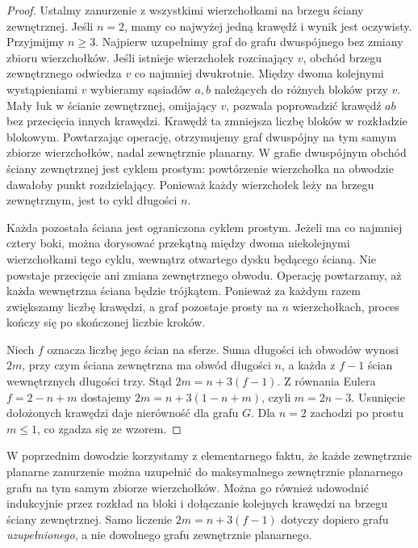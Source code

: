 \begin{proof}
Ustalmy zanurzenie z wszystkimi wierzchołkami na brzegu
ściany zewnętrznej. Jeśli $n=2$, mamy co najwyżej jedną
krawędź i wynik jest oczywisty. Przyjmijmy $n\ge3$.
Najpierw uzupełnimy graf do grafu dwuspójnego bez zmiany
zbioru wierzchołków. Jeśli istnieje wierzchołek rozcinający
$v$, obchód brzegu zewnętrznego odwiedza $v$ co najmniej
dwukrotnie. Między dwoma kolejnymi wystąpieniami $v$
wybieramy sąsiadów $a,b$ należących do różnych bloków
przy $v$. Mały łuk w ścianie zewnętrznej, omijający $v$,
pozwala poprowadzić krawędź $ab$ bez przecięcia innych
krawędzi. Krawędź ta zmniejsza liczbę bloków w rozkładzie
blokowym. Powtarzając operację, otrzymujemy graf dwuspójny
na tym samym zbiorze wierzchołków, nadal zewnętrznie planarny.
W grafie dwuspójnym obchód ściany zewnętrznej jest cyklem
prostym: powtórzenie wierzchołka na obwodzie dawałoby punkt
rozdzielający. Ponieważ każdy wierzchołek leży na brzegu
zewnętrznym, jest to cykl długości $n$.

Każda pozostała ściana jest ograniczona cyklem prostym.
Jeżeli ma co najmniej cztery boki, można dorysować przekątną
między dwoma niekolejnymi wierzchołkami tego cyklu,
wewnątrz otwartego dysku będącego ścianą. Nie powstaje
przecięcie ani zmiana zewnętrznego obwodu. Operację
powtarzamy, aż każda wewnętrzna ściana będzie trójkątem.
Ponieważ za każdym razem zwiększamy liczbę krawędzi,
a graf pozostaje prosty na $n$ wierzchołkach, proces
kończy się po skończonej liczbie kroków.

Niech $f$ oznacza liczbę jego ścian na sferze.
Suma długości ich obwodów wynosi $2m$, przy czym
ściana zewnętrzna ma obwód długości $n$,
a każda z $f-1$ ścian wewnętrznych długości trzy.
Stąd $2m=n+3(f-1)$.
Z równania Eulera $f=2-n+m$ dostajemy
$2m=n+3(1-n+m)$, czyli $m=2n-3$.
Usunięcie dołożonych krawędzi daje nierówność dla grafu $G$.
Dla $n=2$ zachodzi po prostu $m\le1$, co zgadza się ze wzorem.
\end{proof}

\begin{uwaga}
W poprzednim dowodzie korzystamy z elementarnego faktu,
że każde zewnętrznie planarne zanurzenie można uzupełnić
do maksymalnego zewnętrznie planarnego grafu na tym samym
zbiorze wierzchołków. Można go również udowodnić
indukcyjnie przez rozkład na bloki i dołączanie kolejnych
krawędzi na brzegu ściany zewnętrznej. Samo liczenie
$2m=n+3(f-1)$ dotyczy dopiero grafu \emph{uzupełnionego},
a nie dowolnego grafu zewnętrznie planarnego.
\end{uwaga}

